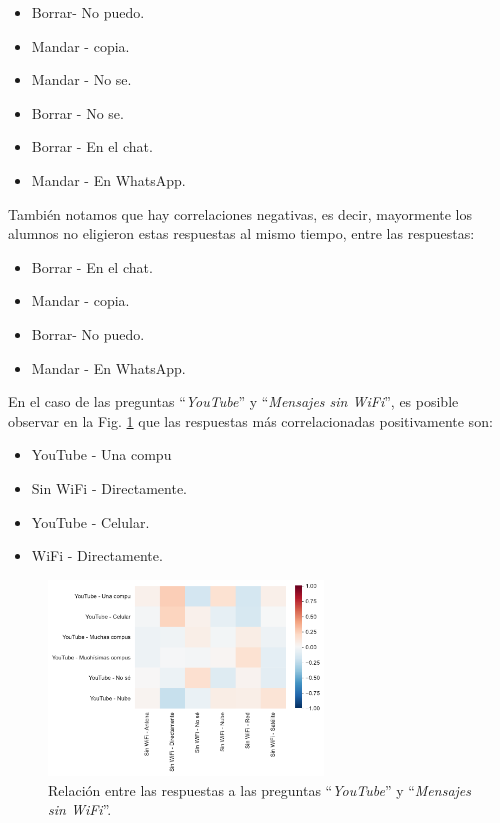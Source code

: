 \begin{itemize}
    \item Borrar- No puedo.
    \item Mandar - copia.
    \item Mandar - No se.
    \item Borrar - No se.
    \item Borrar - En el chat.
    \item Mandar - En WhatsApp.
\end{itemize}

También notamos que hay correlaciones negativas, es decir, mayormente los alumnos no eligieron estas respuestas al mismo tiempo, entre las respuestas:

\begin{itemize}
    \item Borrar - En el chat.
    \item Mandar - copia.
    \item Borrar- No puedo.
    \item Mandar - En WhatsApp.
\end{itemize}

En el caso de las preguntas ``\textit{YouTube}'' y ``\textit{Mensajes sin WiFi}'', es posible observar en la Fig. \ref{fig:analisis30} que las respuestas más correlacionadas positivamente son:

\begin{itemize}
    \item YouTube - Una compu
    \item Sin WiFi - Directamente.
    \item YouTube - Celular.
    \item WiFi - Directamente.
\end{itemize}

\begin{figure}[h]
    \centering
    \includegraphics[width=0.65\textwidth]{images_analisis/30.pdf}
    \caption{Relación entre las respuestas a las preguntas ``\textit{YouTube}'' y ``\textit{Mensajes sin WiFi}''.}
    \label{fig:analisis30}
\end{figure}

